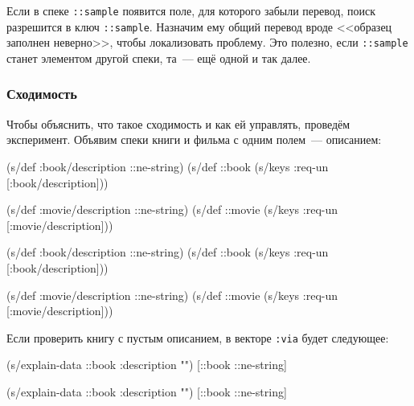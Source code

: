 \fi

Если в спеке \verb|::sample| появится поле, для которого забыли перевод, поиск
разрешится в ключ \verb|::sample|. Назначим ему общий перевод вроде <<образец
заполнен неверно>>, чтобы локализовать проблему. Это полезно, если
\verb|::sample| станет элементом другой спеки, та~--- ещё одной и так далее.

\subsubsection{Сходимость}

Чтобы объяснить, что такое сходимость и как ей управлять, проведём
эксперимент. Объявим спеки книги и фильма с одним полем~--- описанием:

\ifx\DEVICETYPE\MOBILE

\begin{english}
  \begin{clojure}
(s/def :book/description ::ne-string)
(s/def ::book
  (s/keys :req-un [:book/description]))

(s/def :movie/description ::ne-string)
(s/def ::movie
  (s/keys :req-un [:movie/description]))
  \end{clojure}
\end{english}

\else

\begin{english}
  \begin{clojure}
(s/def :book/description ::ne-string)
(s/def ::book (s/keys :req-un [:book/description]))

(s/def :movie/description ::ne-string)
(s/def ::movie (s/keys :req-un [:movie/description]))
  \end{clojure}
\end{english}

\fi

Если проверить книгу с пустым описанием, в векторе \verb|:via| будет следующее:

\ifx\DEVICETYPE\MOBILE

\begin{english}
  \begin{clojure}
(s/explain-data ::book
  {:description ""})
[::book ::ne-string]
  \end{clojure}
\end{english}

\else

\begin{english}
  \begin{clojure}
(s/explain-data ::book {:description ""})
[::book ::ne-string]
  \end{clojure}
\end{english}

